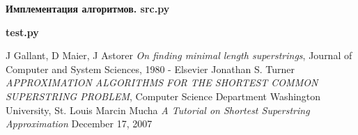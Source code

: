 \documentclass[11pt,a4paper]{article}
\begin{document}

\begin{center}
\Large
\textbf{Имплементация алгоритмов. src.py}
\normalsize
\end{center}
\par
\lstset{
  caption=,
  basicstyle=\footnotesize, frame=tb,
  xleftmargin=-.0\textwidth, xrightmargin=.2\textwidth
}

\begin{center}
\Large
\textbf{test.py}
\normalsize
\end{center}


\begin{thebibliography}{9}
 J Gallant, D Maier, J Astorer
  \emph{ On finding minimal length superstrings},
  Journal of Computer and System Sciences, 1980 - Elsevier
  Jonathan S. Turner
  \emph{ APPROXIMATION ALGORITHMS FOR THE SHORTEST COMMON SUPERSTRING PROBLEM},
  Computer Science Department Washington University, St. Louis
Marcin Mucha
  \emph{A Tutorial on Shortest Superstring Approximation}
  December 17, 2007
\end{thebibliography}
\end{document}
